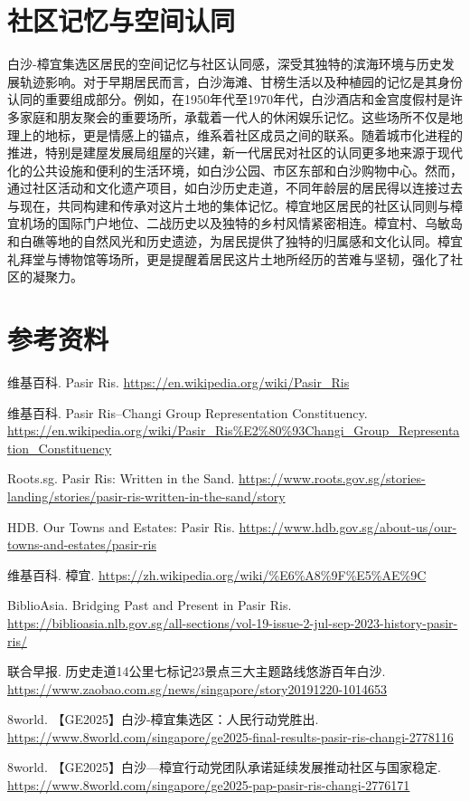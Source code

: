 \documentclass[11pt,a4paper,twoside,openany]{book}
\begin{document}
\section{社区记忆与空间认同}
白沙-樟宜集选区居民的空间记忆与社区认同感，深受其独特的滨海环境与历史发展轨迹影响。对于早期居民而言，白沙海滩、甘榜生活以及种植园的记忆是其身份认同的重要组成部分。例如，在1950年代至1970年代，白沙酒店和金宫度假村是许多家庭和朋友聚会的重要场所，承载着一代人的休闲娱乐记忆。这些场所不仅是地理上的地标，更是情感上的锚点，维系着社区成员之间的联系。随着城市化进程的推进，特别是建屋发展局组屋的兴建，新一代居民对社区的认同更多地来源于现代化的公共设施和便利的生活环境，如白沙公园、市区东部和白沙购物中心。然而，通过社区活动和文化遗产项目，如白沙历史走道，不同年龄层的居民得以连接过去与现在，共同构建和传承对这片土地的集体记忆。樟宜地区居民的社区认同则与樟宜机场的国际门户地位、二战历史以及独特的乡村风情紧密相连。樟宜村、乌敏岛和白礁等地的自然风光和历史遗迹，为居民提供了独特的归属感和文化认同。樟宜礼拜堂与博物馆等场所，更是提醒着居民这片土地所经历的苦难与坚韧，强化了社区的凝聚力。

\section*{参考资料}
\begin{enumerate}[label={[\arabic*]},leftmargin=*,topsep=2pt,itemsep=1pt,parsep=0pt]
  \item 维基百科. Pasir Ris. \url{https://en.wikipedia.org/wiki/Pasir_Ris}
  \item 维基百科. Pasir Ris–Changi Group Representation Constituency. \url{https://en.wikipedia.org/wiki/Pasir_Ris%E2%80%93Changi_Group_Representation_Constituency}
  \item Roots.sg. Pasir Ris: Written in the Sand. \url{https://www.roots.gov.sg/stories-landing/stories/pasir-ris-written-in-the-sand/story}
  \item HDB. Our Towns and Estates: Pasir Ris. \url{https://www.hdb.gov.sg/about-us/our-towns-and-estates/pasir-ris}
  \item 维基百科. 樟宜. \url{https://zh.wikipedia.org/wiki/%E6%A8%9F%E5%AE%9C}
  \item BiblioAsia. Bridging Past and Present in Pasir Ris. \url{https://biblioasia.nlb.gov.sg/all-sections/vol-19-issue-2-jul-sep-2023-history-pasir-ris/}
  \item 联合早报. 历史走道14公里七标记23景点三大主题路线悠游百年白沙. \url{https://www.zaobao.com.sg/news/singapore/story20191220-1014653}
  \item 8world. 【GE2025】白沙-樟宜集选区：人民行动党胜出. \url{https://www.8world.com/singapore/ge2025-final-results-pasir-ris-changi-2778116}
  \item 8world. 【GE2025】白沙—樟宜行动党团队承诺延续发展推动社区与国家稳定. \url{https://www.8world.com/singapore/ge2025-pap-pasir-ris-changi-2776171}
\end{enumerate}
\end{document}
